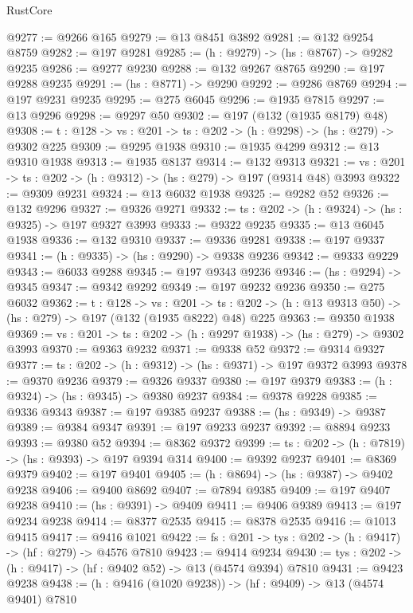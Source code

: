 \begin{lexlean}{RustCore}
\begin{coremodule}
@9277 := @9266 @165
@9279 := @13 @8451 @3892
@9281 := @132 @9254 @8759
@9282 := @197 @9281
@9285 := (h : @9279) -> (hs : @8767) -> @9282 @9235
@9286 := @9277 @9230
@9288 := @132 @9267 @8765
@9290 := @197 @9288 @9235
@9291 := (hs : @8771) -> @9290
@9292 := @9286 @8769
@9294 := @197 @9231 @9235
@9295 := @275 @6045
@9296 := @1935 @7815
@9297 := @13 @9296
@9298 := @9297 @50
@9302 := @197 (@132 (@1935 @8179) @48)
@9308 := {t : @128} -> {vs : @201} -> {ts : @202} -> (h : @9298) -> (hs : @279) -> @9302 @225
@9309 := @9295 @1938
@9310 := @1935 @4299
@9312 := @13 @9310 @1938
@9313 := @1935 @8137
@9314 := @132 @9313
@9321 := {vs : @201} -> {ts : @202} -> (h : @9312) -> (hs : @279) -> @197 (@9314 @48) @3993
@9322 := @9309 @9231
@9324 := @13 @6032 @1938
@9325 := @9282 @52
@9326 := @132 @9296
@9327 := @9326 @9271
@9332 := {ts : @202} -> (h : @9324) -> (hs : @9325) -> @197 @9327 @3993
@9333 := @9322 @9235
@9335 := @13 @6045 @1938
@9336 := @132 @9310
@9337 := @9336 @9281
@9338 := @197 @9337
@9341 := (h : @9335) -> (hs : @9290) -> @9338 @9236
@9342 := @9333 @9229
@9343 := @6033 @9288
@9345 := @197 @9343 @9236
@9346 := (hs : @9294) -> @9345
@9347 := @9342 @9292
@9349 := @197 @9232 @9236
@9350 := @275 @6032
@9362 := {t : @128} ->
  {vs : @201} ->
  {ts : @202} -> (h : @13 @9313 @50) -> (hs : @279) -> @197 (@132 (@1935 @8222) @48) @225
@9363 := @9350 @1938
@9369 := {vs : @201} -> {ts : @202} -> (h : @9297 @1938) -> (hs : @279) -> @9302 @3993
@9370 := @9363 @9232
@9371 := @9338 @52
@9372 := @9314 @9327
@9377 := {ts : @202} -> (h : @9312) -> (hs : @9371) -> @197 @9372 @3993
@9378 := @9370 @9236
@9379 := @9326 @9337
@9380 := @197 @9379
@9383 := (h : @9324) -> (hs : @9345) -> @9380 @9237
@9384 := @9378 @9228
@9385 := @9336 @9343
@9387 := @197 @9385 @9237
@9388 := (hs : @9349) -> @9387
@9389 := @9384 @9347
@9391 := @197 @9233 @9237
@9392 := @8894 @9233
@9393 := @9380 @52
@9394 := @8362 @9372
@9399 := {ts : @202} -> (h : @7819) -> (hs : @9393) -> @197 @9394 @314
@9400 := @9392 @9237
@9401 := @8369 @9379
@9402 := @197 @9401
@9405 := (h : @8694) -> (hs : @9387) -> @9402 @9238
@9406 := @9400 @8692
@9407 := @7894 @9385
@9409 := @197 @9407 @9238
@9410 := (hs : @9391) -> @9409
@9411 := @9406 @9389
@9413 := @197 @9234 @9238
@9414 := @8377 @2535
@9415 := @8378 @2535
@9416 := @1013 @9415
@9417 := @9416 @1021
@9422 := {fs : @201} -> {tys : @202} -> (h : @9417) -> (hf : @279) -> @4576 @7810
@9423 := @9414 @9234
@9430 := {tys : @202} -> (h : @9417) -> (hf : @9402 @52) -> @13 (@4574 @9394) @7810
@9431 := @9423 @9238
@9438 := (h : @9416 (@1020 @9238)) -> (hf : @9409) -> @13 (@4574 @9401) @7810

\end{coremodule}
\end{lexlean}
